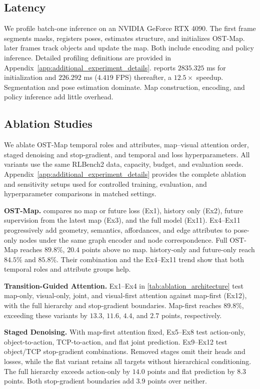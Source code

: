 \subsection{Latency}
\label{sec:latency}

We profile batch-one inference on an NVIDIA GeForce RTX 4090. The first frame
segments masks, registers poses, estimates structure, and initializes OST-Map.
later frames track objects and update the map. Both include encoding and policy
inference. Detailed profiling definitions are provided in
Appendix~\ref{app:additional_experiment_details}.
 reports $2835.325$ ms for initialization and $226.292$ ms
($4.419$ FPS) thereafter, a $12.5\times$ speedup. Segmentation and pose estimation
dominate. Map construction, encoding, and policy inference add little overhead.

\subsection{Ablation Studies}
\label{sec:ablation_studies}

We ablate OST-Map temporal roles and attributes, map--visual attention order,
staged denoising and stop-gradient, and temporal and loss hyperparameters.
All variants use the same RLBench2 data, capacity, budget, and evaluation seeds.
Appendix~\ref{app:additional_experiment_details} provides the complete
ablation and sensitivity setups used for controlled training, evaluation, and
hyperparameter comparisons in matched settings.

\textbf{OST-Map.}
 compares no map or future loss (Ex1),
history only (Ex2), future supervision from the latest map (Ex3), and the full
model (Ex11). Ex4--Ex11 progressively add geometry, semantics, affordances,
and edge attributes to pose-only nodes under the same graph encoder and node
correspondence. Full OST-Map reaches $89.8\%$, $20.4$ points above no map.
history-only and future-only reach $84.5\%$ and $85.8\%$. Their combination and
the Ex4--Ex11 trend show that both temporal roles and attribute groups help.

\textbf{Transition-Guided Attention.}
Ex1--Ex4 in \cref{tab:ablation_architecture} test map-only, visual-only, joint,
and visual-first attention against map-first (Ex12), with the full hierarchy
and stop-gradient boundaries. Map-first reaches $89.8\%$, exceeding these
variants by $13.3$, $11.6$, $4.4$, and $2.7$ points, respectively.

\textbf{Staged Denoising.}
With map-first attention fixed, Ex5--Ex8 test action-only, object-to-action,
TCP-to-action, and flat joint prediction. Ex9--Ex12 test object/TCP
stop-gradient combinations. Removed stages omit their heads and losses, while
the flat variant retains all targets without hierarchical conditioning. The
full hierarchy exceeds action-only by $14.0$ points and flat prediction by
$8.3$ points. Both stop-gradient boundaries add $3.9$ points over neither.

